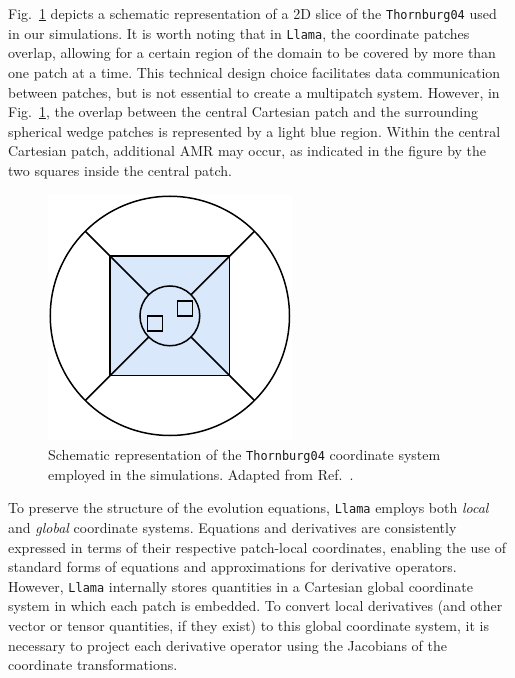 Fig.~\ref{fig:wave_scattering_multipatch_coords} depicts a schematic representation of a 2D slice of the \texttt{Thornburg04} used in our simulations. It is worth noting that in \texttt{Llama}, the coordinate patches overlap, allowing for a certain region of the domain to be covered by more than one patch at a time. This technical design choice facilitates data communication between patches, but is not essential to create a multipatch system. However, in Fig.~\ref{fig:wave_scattering_multipatch_coords}, the overlap between the central Cartesian patch and the surrounding spherical wedge patches is represented by a light blue region. Within the central Cartesian patch, additional AMR may occur, as indicated in the figure by the two squares inside the central patch.

\begin{figure}[h]
  \centering
  \includegraphics[width=0.60\linewidth]{img/wave_scattering/multipatch_coords}
  \caption{Schematic representation of the \texttt{Thornburg04} coordinate system employed in the simulations. Adapted from Ref.~\cite{Reisswig2010}.}
  \label{fig:wave_scattering_multipatch_coords}
\end{figure}

To preserve the structure of the evolution equations, \texttt{Llama} employs both \textit{local} and \textit{global} coordinate systems. Equations and derivatives are consistently expressed in terms of their respective patch-local coordinates, enabling the use of standard forms of equations and approximations for derivative operators. However, \texttt{Llama} internally stores quantities in a Cartesian global coordinate system in which each patch is embedded. To convert local derivatives (and other vector or tensor quantities, if they exist) to this global coordinate system, it is necessary to project each derivative operator using the Jacobians of the coordinate transformations.

